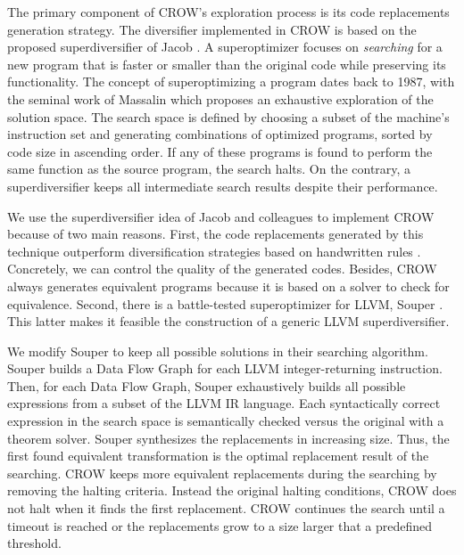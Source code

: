 
The primary component of CROW's exploration process is its code replacements generation strategy. The diversifier implemented in CROW is based on the proposed superdiversifier of Jacob \etal \cite{jacob2008superdiversifier}.
A superoptimizer focuses on \emph{searching} for a new program that is faster or smaller than the original code while preserving its functionality.
The concept of superoptimizing a program dates back to 1987, with the seminal work of Massalin \cite{Massalin1987} which proposes an exhaustive exploration of the solution space. The search space is defined by choosing a subset of the machine's instruction set and generating combinations of optimized programs, sorted by code size in ascending order. If any of these programs is found to perform the same function as the source program, the search halts. On the contrary, a superdiversifier keeps all intermediate search results despite their performance. 

We use the superdiversifier idea of Jacob and colleagues to implement CROW because of two main reasons.
First, the code replacements generated by this technique outperform diversification strategies based on handwritten rules . 
Concretely, we can control the quality of the generated codes. 
Besides, CROW always generates equivalent programs because it is based on a solver to check for equivalence. 
Second, there is a battle-tested superoptimizer for LLVM, Souper \cite{Sasnauskas2017Souper:Superoptimizer}. 
This latter makes it feasible the construction of a generic LLVM superdiversifier. 

We modify Souper to keep all possible solutions in their searching algorithm.
Souper builds a Data Flow Graph for each LLVM integer-returning instruction. 
Then, for each Data Flow Graph, Souper exhaustively builds all possible expressions from a subset of the LLVM IR language.
Each syntactically correct expression in the search space is semantically checked versus the original with a theorem solver. Souper synthesizes the replacements in increasing size. Thus, the first found equivalent transformation is the optimal replacement result of the searching. 
CROW keeps more equivalent replacements during the searching by removing the halting criteria. Instead the original halting conditions, CROW does not halt when it finds the first replacement. CROW continues the search until a timeout is reached or the replacements grow to a size larger that a predefined threshold. 

